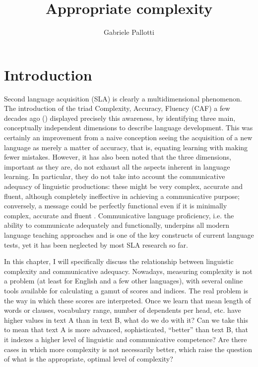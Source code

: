 \documentclass[output=paper]{langscibook}
\author{Gabriele Pallotti\orcid{}\affiliation{University of Modena and Reggio Emilia}}
\title{Appropriate complexity}
\begin{document}
\AffiliationsWithoutIndexing{}
\maketitle 

\section{Introduction}\label{sec:pallotti:1}

Second language acquisition (SLA) is clearly a multidimensional phenomenon. The introduction of the triad Complexity, Accuracy, Fluency (CAF) a few decades ago (\citealt{Skehan1998, Wolfe-QuinteroEtAl1998}) displayed precisely this awareness, by identifying three main, conceptually independent dimensions to describe language development. This was certainly an improvement from a naive conception seeing the acquisition of a new language as merely a matter of accuracy, that is, equating learning with making fewer mistakes. However, it has also been noted that the three dimensions, important as they are, do not exhaust all the aspects inherent in language learning. In particular, they do not take into account the communicative adequacy of linguistic productions: these might be very complex, accurate and fluent, although completely ineffective in achieving a communicative purpose; conversely, a message could be perfectly functional even if it is minimally complex, accurate and fluent \citep{Pallotti2009}. Communicative language proficiency, i.e. the ability to communicate adequately and functionally, underpins all modern language teaching approaches and is one of the key constructs of current language tests, yet it has been neglected by most SLA research so far. 

In this chapter, I will specifically discuss the relationship between linguistic complexity and communicative adequacy. Nowadays, measuring complexity is not a problem (at least for English and a few other languages), with several online tools available for calculating a gamut of scores and indices. The real problem is the way in which these scores are interpreted. Once we learn that mean length of words or clauses, vocabulary range, number of dependents per head, etc. have higher values in text A than in text B, what do we do with it? Can we take this to mean that text A is more advanced, sophisticated, “better” than text B, that it indexes a higher level of linguistic and communicative competence? Are there cases in which more complexity is not necessarily better, which raise the question of what is the appropriate, optimal level of complexity? 
\end{document}
